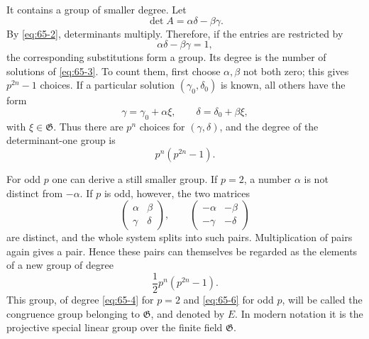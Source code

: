\documentclass[11pt,a4paper]{book}
\begin{document}
It contains a group of smaller degree.  Let
\[
 \det A=\alpha\delta-\beta\gamma.
\]
By \eqref{eq:65-2}, determinants multiply.  Therefore, if the entries are restricted by
\begin{equation}\label{eq:65-3}
 \alpha\delta-\beta\gamma=1,
\end{equation}
the corresponding substitutions form a group.  Its degree is the number of solutions of \eqref{eq:65-3}.  To count them, first choose \(\alpha,\beta\) not both zero; this gives \(p^{2n}-1\) choices.  If a particular solution \((\gamma_0,\delta_0)\) is known, all others have the form
\[
 \gamma=\gamma_0+\alpha\xi,
 \qquad
 \delta=\delta_0+\beta\xi,
\]
with \(\xi\in\mathfrak G\).  Thus there are \(p^n\) choices for \((\gamma,\delta)\), and the degree of the determinant-one group is
\begin{equation}\label{eq:65-4}
 p^n(p^{2n}-1).
\end{equation}

For odd \(p\) one can derive a still smaller group.  If \(p=2\), a number \(\alpha\) is not distinct from \(-\alpha\).  If \(p\) is odd, however, the two matrices
\begin{equation}\label{eq:65-5}
 \begin{pmatrix}\alpha&\beta\\\gamma&\delta\end{pmatrix},
 \qquad
 \begin{pmatrix}-\alpha&-\beta\\-\gamma&-\delta\end{pmatrix}
\end{equation}
are distinct, and the whole system splits into such pairs.  Multiplication of pairs again gives a pair.  Hence these pairs can themselves be regarded as the elements of a new group of degree
\begin{equation}\label{eq:65-6}
 \frac12 p^n(p^{2n}-1).
\end{equation}
This group, of degree \eqref{eq:65-4} for \(p=2\) and \eqref{eq:65-6} for odd \(p\), will be called the congruence group belonging to \(\mathfrak G\), and denoted by \(E\).  In modern notation it is the projective special linear group over the finite field \(\mathfrak G\).
\end{document}
